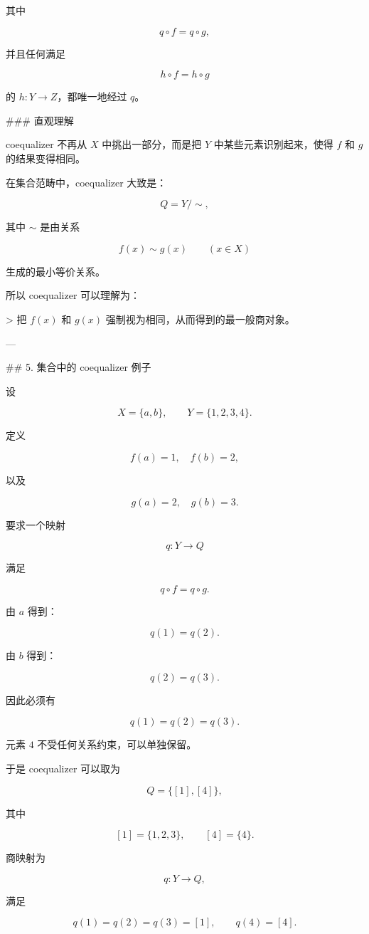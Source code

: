\documentclass{ctexart}
\begin{document}
\begin{markdown}
其中

$$
q\circ f=q\circ g,
$$

并且任何满足

$$
h\circ f=h\circ g
$$

的 $h:Y\to Z$，都唯一地经过 $q$。

### 直观理解

coequalizer 不再从 $X$ 中挑出一部分，而是把 $Y$ 中某些元素识别起来，使得 $f$ 和 $g$ 的结果变得相同。

在集合范畴中，coequalizer 大致是：

$$
Q=Y/{\sim},
$$

其中 $\sim$ 是由关系

$$
f(x)\sim g(x)\qquad (x\in X)
$$

生成的最小等价关系。

所以 coequalizer 可以理解为：

> 把 $f(x)$ 和 $g(x)$ 强制视为相同，从而得到的最一般商对象。

---

## 5. 集合中的 coequalizer 例子

设

$$
X=\{a,b\},\qquad Y=\{1,2,3,4\}.
$$

定义

$$
f(a)=1,\quad f(b)=2,
$$

以及

$$
g(a)=2,\quad g(b)=3.
$$

要求一个映射

$$
q:Y\to Q
$$

满足

$$
q\circ f=q\circ g.
$$

由 $a$ 得到：

$$
q(1)=q(2).
$$

由 $b$ 得到：

$$
q(2)=q(3).
$$

因此必须有

$$
q(1)=q(2)=q(3).
$$

元素 $4$ 不受任何关系约束，可以单独保留。

于是 coequalizer 可以取为

$$
Q=\{[1],[4]\},
$$

其中

$$
[1]=\{1,2,3\},\qquad [4]=\{4\}.
$$

商映射为

$$
q:Y\to Q,
$$

满足

$$
q(1)=q(2)=q(3)=[1],\qquad q(4)=[4].
$$


\end{markdown}
\end{document}
